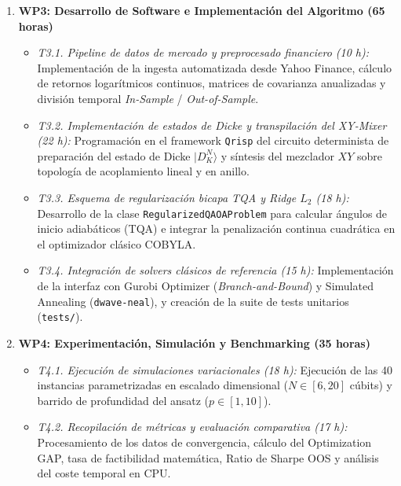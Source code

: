 \begin{enumerate}[leftmargin=*]
    \item \textbf{WP3: Desarrollo de Software e Implementación del Algoritmo (65 horas)}
    \begin{itemize}
        \item \textit{T3.1. Pipeline de datos de mercado y preprocesado financiero (10 h):} Implementación de la ingesta automatizada desde Yahoo Finance, cálculo de retornos logarítmicos continuos, matrices de covarianza anualizadas y división temporal \textit{In-Sample} / \textit{Out-of-Sample}.
        \item \textit{T3.2. Implementación de estados de Dicke y transpilación del XY-Mixer (22 h):} Programación en el framework \texttt{Qrisp} del circuito determinista de preparación del estado de Dicke $|D_K^N\rangle$ y síntesis del mezclador $XY$ sobre topología de acoplamiento lineal y en anillo.
        \item \textit{T3.3. Esquema de regularización bicapa TQA y Ridge $L_2$ (18 h):} Desarrollo de la clase \texttt{RegularizedQAOAProblem} para calcular ángulos de inicio adiabáticos (TQA) e integrar la penalización continua cuadrática en el optimizador clásico COBYLA.
        \item \textit{T3.4. Integración de solvers clásicos de referencia (15 h):} Implementación de la interfaz con Gurobi Optimizer (\textit{Branch-and-Bound}) y Simulated Annealing (\texttt{dwave-neal}), y creación de la suite de tests unitarios (\texttt{tests/}).
    \end{itemize}

    \item \textbf{WP4: Experimentación, Simulación y Benchmarking (35 horas)}
    \begin{itemize}
        \item \textit{T4.1. Ejecución de simulaciones variacionales (18 h):} Ejecución de las 40 instancias parametrizadas en escalado dimensional ($N \in [6, 20]$ cúbits) y barrido de profundidad del ansatz ($p \in [1, 10]$).
        \item \textit{T4.2. Recopilación de métricas y evaluación comparativa (17 h):} Procesamiento de los datos de convergencia, cálculo del Optimization GAP, tasa de factibilidad matemática, Ratio de Sharpe OOS y análisis del coste temporal en CPU.
    \end{itemize}


\end{enumerate}
